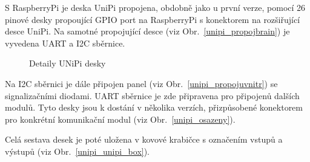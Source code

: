 \newpage

S RaspberryPi je deska UniPi propojena, obdobně jako u první verze, pomocí 26 pinové desky propoující GPIO port na RaspberryPi s konektorem na rozšiřující desce UniPi. Na samotné propojující desce (viz Obr.~\ref{unipi_propojbrain}) je vyvedena UART a I2C sběrnice. 

\begin{figure}[!ht]
    \centering
			\hspace*{5mm}
			\caption{Detaily UNiPi desky}
\end{figure}

Na I2C sběrnici je dále připojen panel (viz Obr.~\ref{unipi_propojuvnitr}) se signalizačními diodami. UART sběrnice je zde připravena pro připojenů dalších modulů. Tyto desky jsou k dostání v několika verzích, přizpůsobené konektorem pro konkrétní komunikační modul (viz Obr.~\ref{unipi_osazeny}).
 
Celá sestava desek je poté uložena v kovové krabičce s označením vstupů a výstupů (viz Obr.~\ref{unipi_unipi_box}).


